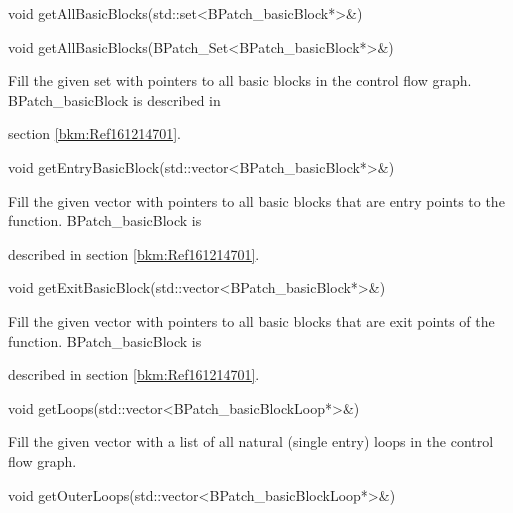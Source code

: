 {

void getAllBasicBlocks(std::set<BPatch_basicBlock*>&)



{

void getAllBasicBlocks(BPatch_Set<BPatch_basicBlock*>&)

}



{

Fill the given set with pointers to all basic blocks in the control flow graph. BPatch_basicBlock is described in

section \ref{bkm:Ref161214701}.}



{

void getEntryBasicBlock(std::vector<BPatch_basicBlock*>&)}



{

Fill the given vector with pointers to all basic blocks that are entry points to the function. BPatch_basicBlock is

described in section \ref{bkm:Ref161214701}.}



{

void getExitBasicBlock(std::vector<BPatch_basicBlock*>&)}



{

Fill the given vector with pointers to all basic blocks that are exit points of the function. BPatch_basicBlock is

described in section \ref{bkm:Ref161214701}.}



{

void getLoops(std::vector<BPatch_basicBlockLoop*>&)}



{

Fill the given vector with a list of all natural (single entry) loops in the control flow graph.}





\bigskip



{

void getOuterLoops(std::vector<BPatch_basicBlockLoop*>&)}



}
